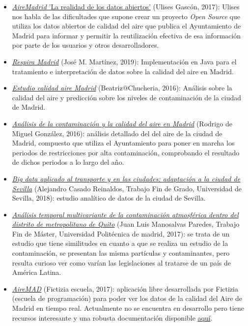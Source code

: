 \begin{itemize}
	\item \href{https://github.com/UlisesGascon/Charla-AireMadrid-los-datos-abiertos}{\textit{AireMadrid} 'La realidad de los datos abiertos'} (Ulises Gascón, 2017): Ulises nos habla de las dificultades que supone crear un proyecto \textit{Open Source} que utiliza los datos abiertos de calidad del aire que publica el Ayuntamiento de Madrid para informar y permitir la reutilización efectiva de esa información por parte de los usuarios y otros desarrolladores.
	\item \href{https://github.com/Toolson12/poisonMAD}{\textit{Respira Madrid}} (José M. Martínez, 2019): Implementación en Java para el tratamiento e interpretación de datos sobre la calidad del aire en Madrid.
	\item \href{https://github.com/chucheria/CalidadAire}{\textit{Estudio calidad aire Madrid}} (Beatriz@Chucheria, 2016): Análisis sobre la calidad del aire y predicción sobre los niveles de contaminación de la ciudad de Madrid.
	\item \href{https://www.rodrigodemiguel.es/AnalisisAireMadrid/}{\textit{Análisis de la contaminación y la calidad del aire en Madrid}} (Rodrigo de Miguel González, 2016): análisis detallado del  del aire de la ciudad de Madrid, compuesto que utiliza el Ayuntamiento para poner en marcha los periodos de restricciones por alta contaminación, comprobando el resultado de dichos periodos a lo largo del año.
	\item \href{https://idus.us.es/xmlui/handle/11441/79499}{\textit{Big data aplicado al transporte y en las ciudades: adaptación a la ciudad de Sevilla}} (Alejandro Casado Reinaldos, Trabajo Fin de Grado, Universidad de Sevilla, 2018): estudio analítico de datos de la ciudad de Sevilla. 
	\item \href{http://oa.upm.es/47313/}{\textit{Análisis temporal multivariante de la contaminación atmosférica dentro del distrito de metropolitano de Quito}} (Juan Luis Manosalvas Paredes, Trabajo Fin de Máster, Universidad Politécnica de madrid, 2017): se trata de un estudio que tiene  similitudes en cuanto a que se realiza un estudio de la contaminación, se presentan las misma partículas y contaminantes, pero resulta curioso ver como varían las legislaciones al tratarse de un país de América Latina.
	\item \href{https://github.com/Fictizia/aireMAD}{\textit{AireMAD}} (Fictizia escuela, 2017): aplicación libre desarrollada por Fictizia (escuela de programación) para poder ver los datos de la calidad del Aire de Madrid en tiempo real. Actualmente no se encuentra en desarrollo pero tiene recursos interesante y una robusta documentación disponible  \href{https://github.com/Fictizia/aireMAD/wiki}{aquí}.
\end{itemize}


 
